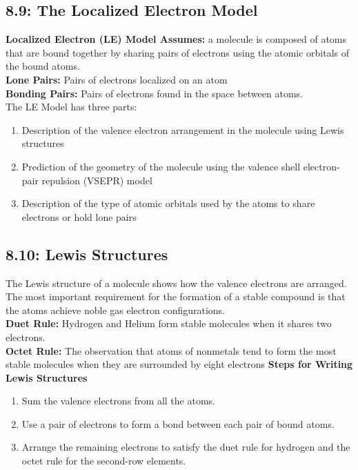 \documentclass[12pt]{extarticle}
\begin{document}
\subsection*{8.9: The Localized Electron Model}
\textbf{Localized Electron (LE) Model Assumes:}
a molecule is composed of atoms that are bound together by sharing pairs of electrons using the atomic orbitals of the bound atoms.
\\\textbf{Lone Pairs:}
Pairs of electrons localized on an atom
\\\textbf{Bonding Pairs:}
Pairs of electrons found in the space between atoms.
\\The LE Model has three parts:
\begin{enumerate}
    \item Description of the valence electron arrangement in the molecule using Lewis structures
    \item Prediction of the geometry of the molecule using the valence shell electron-pair repulsion (VSEPR) model
    \item Description of the type of atomic orbitals used by the atoms to share electrons or hold lone pairs
\end{enumerate}

\subsection*{8.10: Lewis Structures}
The Lewis structure of a molecule shows how the valence electrons are arranged.
\\The most important requirement for the formation of a stable compound is that the atoms achieve noble gas electron configurations.
\\\textbf{Duet Rule:}
Hydrogen and Helium form stable molecules when it shares two electrons.
\\\textbf{Octet Rule:}
The observation that atoms of nonmetals tend to form the most stable molecules when they are surrounded by eight electrons
\newpage
\textbf{Steps for Writing Lewis Structures}
\begin{enumerate}
    \item Sum the valence electrons from all the atoms.
    \item Use a pair of electrons to form a bond between each pair of bound atoms.
    \item Arrange the remaining electrons to satisfy the duet rule for hydrogen and the octet rule for the second-row elements.
\end{enumerate}
\end{document}
